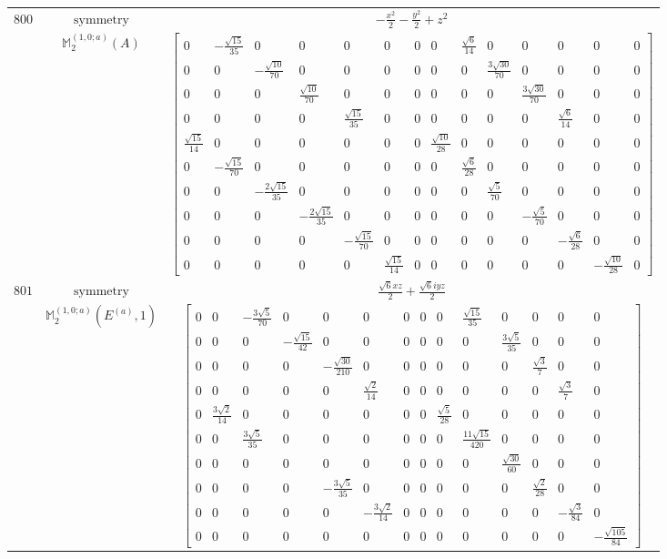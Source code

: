 \documentclass[fleqn,8pt,landscape]{jsarticle}
\begin{document}
\begin{longtable}{ccc}
$ 800 $ & $ \text{symmetry} $ & $ - \frac{x^{2}}{2} - \frac{y^{2}}{2} + z^{2} $ \\
$  $ & $ \mathbb{M}_{2}^{(1,0;a)}(A) $ & $ \begin{bmatrix} 0 & - \frac{\sqrt{15}}{35} & 0 & 0 & 0 & 0 & 0 & 0 & \frac{\sqrt{6}}{14} & 0 & 0 & 0 & 0 & 0 \\ 0 & 0 & - \frac{\sqrt{10}}{70} & 0 & 0 & 0 & 0 & 0 & 0 & \frac{3 \sqrt{30}}{70} & 0 & 0 & 0 & 0 \\ 0 & 0 & 0 & \frac{\sqrt{10}}{70} & 0 & 0 & 0 & 0 & 0 & 0 & \frac{3 \sqrt{30}}{70} & 0 & 0 & 0 \\ 0 & 0 & 0 & 0 & \frac{\sqrt{15}}{35} & 0 & 0 & 0 & 0 & 0 & 0 & \frac{\sqrt{6}}{14} & 0 & 0 \\ \frac{\sqrt{15}}{14} & 0 & 0 & 0 & 0 & 0 & 0 & \frac{\sqrt{10}}{28} & 0 & 0 & 0 & 0 & 0 & 0 \\ 0 & - \frac{\sqrt{15}}{70} & 0 & 0 & 0 & 0 & 0 & 0 & \frac{\sqrt{6}}{28} & 0 & 0 & 0 & 0 & 0 \\ 0 & 0 & - \frac{2 \sqrt{15}}{35} & 0 & 0 & 0 & 0 & 0 & 0 & \frac{\sqrt{5}}{70} & 0 & 0 & 0 & 0 \\ 0 & 0 & 0 & - \frac{2 \sqrt{15}}{35} & 0 & 0 & 0 & 0 & 0 & 0 & - \frac{\sqrt{5}}{70} & 0 & 0 & 0 \\ 0 & 0 & 0 & 0 & - \frac{\sqrt{15}}{70} & 0 & 0 & 0 & 0 & 0 & 0 & - \frac{\sqrt{6}}{28} & 0 & 0 \\ 0 & 0 & 0 & 0 & 0 & \frac{\sqrt{15}}{14} & 0 & 0 & 0 & 0 & 0 & 0 & - \frac{\sqrt{10}}{28} & 0 \end{bmatrix} $ \\ \hline
$ 801 $ & $ \text{symmetry} $ & $ \frac{\sqrt{6} x z}{2} + \frac{\sqrt{6} i y z}{2} $ \\
$  $ & $ \mathbb{M}_{2}^{(1,0;a)}(E^{(a)},1) $ & $ \begin{bmatrix} 0 & 0 & - \frac{3 \sqrt{5}}{70} & 0 & 0 & 0 & 0 & 0 & 0 & \frac{\sqrt{15}}{35} & 0 & 0 & 0 & 0 \\ 0 & 0 & 0 & - \frac{\sqrt{15}}{42} & 0 & 0 & 0 & 0 & 0 & 0 & \frac{3 \sqrt{5}}{35} & 0 & 0 & 0 \\ 0 & 0 & 0 & 0 & - \frac{\sqrt{30}}{210} & 0 & 0 & 0 & 0 & 0 & 0 & \frac{\sqrt{3}}{7} & 0 & 0 \\ 0 & 0 & 0 & 0 & 0 & \frac{\sqrt{2}}{14} & 0 & 0 & 0 & 0 & 0 & 0 & \frac{\sqrt{3}}{7} & 0 \\ 0 & \frac{3 \sqrt{2}}{14} & 0 & 0 & 0 & 0 & 0 & 0 & \frac{\sqrt{5}}{28} & 0 & 0 & 0 & 0 & 0 \\ 0 & 0 & \frac{3 \sqrt{5}}{35} & 0 & 0 & 0 & 0 & 0 & 0 & \frac{11 \sqrt{15}}{420} & 0 & 0 & 0 & 0 \\ 0 & 0 & 0 & 0 & 0 & 0 & 0 & 0 & 0 & 0 & \frac{\sqrt{30}}{60} & 0 & 0 & 0 \\ 0 & 0 & 0 & 0 & - \frac{3 \sqrt{5}}{35} & 0 & 0 & 0 & 0 & 0 & 0 & \frac{\sqrt{2}}{28} & 0 & 0 \\ 0 & 0 & 0 & 0 & 0 & - \frac{3 \sqrt{2}}{14} & 0 & 0 & 0 & 0 & 0 & 0 & - \frac{\sqrt{3}}{84} & 0 \\ 0 & 0 & 0 & 0 & 0 & 0 & 0 & 0 & 0 & 0 & 0 & 0 & 0 & - \frac{\sqrt{105}}{84} \end{bmatrix} $ \\ \hline

\end{longtable}
\end{document}
